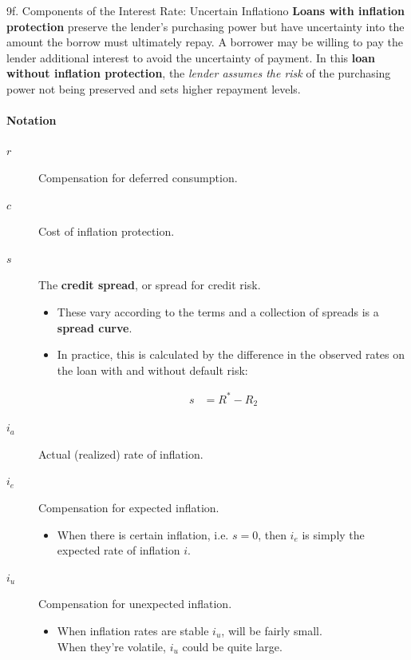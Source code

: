 \begin{CHPT_SUMM_AUTO}[label = {L.-9f}]{9f. Components of the Interest Rate: Uncertain Inflationo}
\textbf{Loans with inflation protection} preserve the lender's purchasing power but have uncertainty into the amount the borrow must ultimately repay. A borrower may be willing to pay the lender additional interest to avoid the uncertainty of payment. In this \textbf{loan without inflation protection}, the \textit{lender assumes the risk} of the purchasing power not being preserved and sets higher repayment levels.\\

\paragraph{Notation}
\begin{description}
	\item[$r$]	Compensation for deferred consumption.
	\item[$c$]	Cost of inflation protection.
	\item[$s$]	The \textbf{credit spread}, or spread for credit risk.
		\begin{itemize}[leftmargin = *]
		\item	These vary according to the terms and a collection of spreads is a \textbf{spread curve}.
		\item	In practice, this is calculated by the difference in the observed rates on the loan with and without default risk:
		\end{itemize}
		\begin{align*}
		s	&=	R^{*} - R_{2}
		\end{align*}
	\item[$i_{a}$]	Actual (realized) rate of inflation.
	\item[$i_{e}$]	Compensation for expected inflation.
		\begin{itemize}[leftmargin = *]
		\item	When there is certain inflation, i.e. $s = 0$, then $i_{e}$ is simply the expected rate of inflation $i$.
		\end{itemize}
	\item[$i_{u}$]	Compensation for unexpected inflation.
		\begin{itemize}[leftmargin = *]
		\item	When inflation rates are stable $i_{u}$, will be fairly small.\\
			 	When they're volatile, $i_{u}$ could be quite large.
		\end{itemize}

\end{description}
\end{CHPT_SUMM_AUTO}
